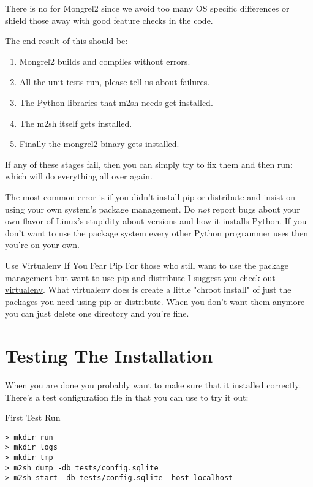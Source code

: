 There is no  for Mongrel2 since we avoid too many OS specific
differences or shield those away with good feature checks in the code.

The end result of this should be:

\begin{enumerate}
\item Mongrel2 builds and compiles without errors.
\item All the unit tests run, please tell us about failures.
\item The Python libraries that m2sh needs get installed.
\item The m2sh itself gets installed.
\item Finally the mongrel2 binary gets installed.
\end{enumerate}

If any of these stages fail, then you can simply try to fix them and then
run:   which will do everything all over again.

The most common error is if you didn't install pip or distribute and insist
on using your own system's package management.  Do \emph{not} report bugs about
your own flavor of Linux's stupidity about versions and how it installs Python.
If you don't want to use the package system every other Python programmer uses
then you're on your own.

\begin{aside}{Use Virtualenv If You Fear Pip}
For those who still want to use the package management but want to use pip and
distribute I suggest you check out \href{http://pypi.python.org/pypi/virtualenv}{virtualenv}.
What virtualenv does is create a little "chroot install" of just the packages
you need using pip or distribute.  When you don't want them anymore you can just
delete one directory and you're fine.
\end{aside}


\section{Testing The Installation}

When you are done you probably want to make sure that it installed correctly.
There's a test configuration file in  that you can 
use to try it out:

\begin{code}{First Test Run}
\begin{verbatim}
> mkdir run
> mkdir logs
> mkdir tmp
> m2sh dump -db tests/config.sqlite
> m2sh start -db tests/config.sqlite -host localhost
\end{verbatim}
\end{code}


